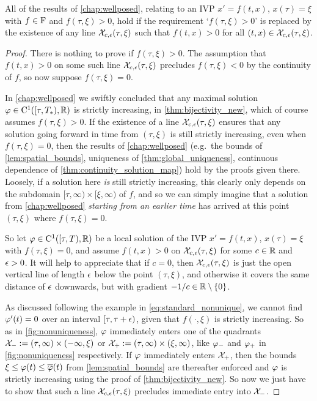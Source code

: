 \begin{theorem}\label{thm:include_zero}
    All of the results of \autoref{chap:wellposed}, relating to an IVP $x'=f(t,x)$, $x(\tau)=\xi$ with $f\in\mathrm{F}$ and $f(\tau,\xi)>0$, hold if the requirement `$f(\tau,\xi)>0$' is replaced by the existence of any line $\mathcal{X}_{c,\epsilon}(\tau,\xi)$ such that $f(t,x)>0$ for all $(t,x)\in\mathcal{X}_{c,\epsilon}(\tau,\xi)$.
\end{theorem}
\begin{proof}
    There is nothing to prove if $f(\tau,\xi)>0$. The assumption that $f(t,x)>0$ on some such line $\mathcal{X}_{c,\epsilon}(\tau,\xi)$ precludes $f(\tau,\xi)<0$ by the continuity of $f$, so now suppose $f(\tau,\xi)=0$.

    In \autoref{chap:wellposed} we swiftly concluded that any maximal solution $\varphi\in\mathrm{C}^1([\tau,T_*),\mathbb{R})$ is strictly increasing, in \autoref{thm:bijectivity_new}, which of course assumes $f(\tau,\xi)>0$. If the existence of a line $\mathcal{X}_{c,\epsilon}(\tau,\xi)$ ensures that any solution going forward in time from $(\tau,\xi)$ is still strictly increasing, even when $f(\tau,\xi)=0$, then the results of \autoref{chap:wellposed} (e.g.~the bounds of \autoref{lem:spatial_bounds}, uniqueness of \autoref{thm:global_uniqueness}, continuous dependence of \autoref{thm:continuity_solution_map}) hold by the proofs given there. Loosely, if a solution here \emph{is} still strictly increasing, this clearly only depends on the subdomain $[\tau,\infty)\times[\xi,\infty)$ of $f$, and so we can simply imagine that a solution from \autoref{chap:wellposed} \emph{starting from an earlier time} has arrived at this point $(\tau,\xi)$ where $f(\tau,\xi)=0$.

    So let $\varphi\in\mathrm{C}^1([\tau,T),\mathbb{R})$ be a local solution of the IVP $x'=f(t,x)$, $x(\tau)=\xi$ with $f(\tau,\xi)=0$, and assume $f(t,x)>0$ on $\mathcal{X}_{c,\epsilon}(\tau,\xi)$ for some $c\in\mathbb{R}$ and $\epsilon>0$. It will help to appreciate that if $c=0$, then $\mathcal{X}_{c,\epsilon}(\tau,\xi)$ is just the open vertical line of length $\epsilon$ below the point $(\tau,\xi)$, and otherwise it covers the same distance of $\epsilon$ downwards, but with gradient $-1/c\in\mathbb{R}\setminus\{0\}$.

    As discussed following the example in \autoref{eq:standard_nonunique}, we cannot find $\varphi'(t)=0$ over an interval $[\tau,\tau+\epsilon)$, given that $f(\cdot,\xi)$ is strictly increasing. So as in \autoref{fig:nonuniqueness}, $\varphi$ immediately enters one of the quadrants $\mathcal{X}_-:=(\tau,\infty)\times(-\infty,\xi)$ or $\mathcal{X}_+:=(\tau,\infty)\times(\xi,\infty)$, like $\varphi_-$ and $\varphi_+$ in \autoref{fig:nonuniqueness} respectively. If $\varphi$ immediately enters $\mathcal{X}_+$, then the bounds $\xi\le\varphi(t)\le\overline{\varphi}(t)$ from \autoref{lem:spatial_bounds} are thereafter enforced and $\varphi$ is strictly increasing using the proof of \autoref{thm:bijectivity_new}. So now we just have to show that such a line $\mathcal{X}_{c,\epsilon}(\tau,\xi)$ precludes immediate entry into $\mathcal{X}_-$.


\end{proof}
